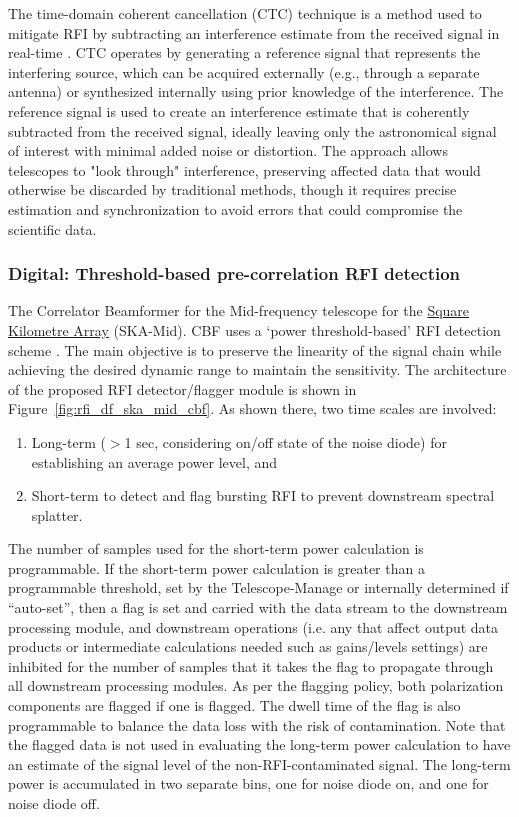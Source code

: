 The time-domain coherent cancellation (CTC) technique is a method used to mitigate RFI by subtracting an interference estimate from the received signal in real-time \citep{ellingson2022coherent}. CTC operates by generating a reference signal that represents the interfering source, which can be acquired externally (e.g., through a separate antenna) or synthesized internally using prior knowledge of the interference. The reference signal is used to create an interference estimate that is coherently subtracted from the received signal, ideally leaving only the astronomical signal of interest with minimal added noise or distortion. The approach allows telescopes to "look through" interference, preserving affected data that would otherwise be discarded by traditional methods, though it requires precise estimation and synchronization to avoid errors that could compromise the scientific data.

\subsubsection{Digital: Threshold-based pre-correlation RFI detection}
\label{subsection:hardware:catalog:ska-mid}

The Correlator Beamformer for the Mid-frequency telescope for the \href{https://www.skao.int/en}{Square Kilometre Array} (SKA-Mid). CBF uses a `power threshold-based' RFI detection scheme \citep{ska_mid_cbf_rfi_2019}. The main objective is to preserve the linearity of the signal chain while achieving the desired dynamic range to maintain the sensitivity. The architecture of the proposed RFI detector/flagger module is shown in Figure~\ref{fig:rfi_df_ska_mid_cbf}. As shown there, two time scales are involved:
\begin{enumerate}
    \item Long-term ($>$1 sec, considering on/off state of the noise diode) for establishing an average power level, and
    \item Short-term to detect and flag bursting RFI to prevent downstream spectral splatter.
\end{enumerate}

The number of samples used for the short-term power calculation is programmable. If the short-term power calculation is greater than a programmable threshold, set by the Telescope-Manage or internally determined if ``auto-set'', then a flag is set and carried with the data stream to the downstream processing module, and downstream operations (i.e. any that affect output data products or intermediate calculations needed such as gains/levels settings) are inhibited for the number of samples that it takes the flag to propagate through all downstream processing modules. As per the flagging policy, both polarization components are flagged if one is flagged. The dwell time of the flag is also programmable to balance the data loss with the risk of contamination. Note that the flagged data is not used in evaluating the long-term power calculation to have an estimate of the signal level of the non-RFI-contaminated signal. The long-term power is accumulated in two separate bins, one for noise diode on, and one for noise diode off.


